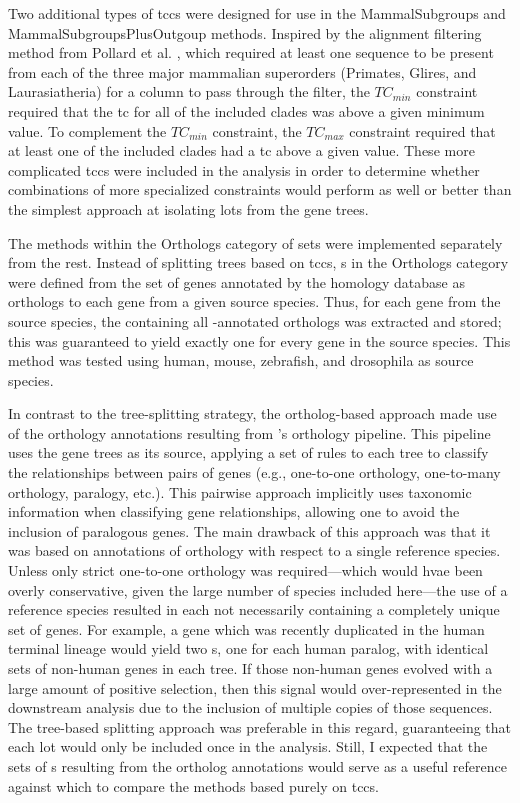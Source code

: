 Two additional types of \acp{tcc} were designed for use in the
MammalSubgroups and MammalSubgroupsPlusOutgoup methods. Inspired by
the alignment filtering method from Pollard et
al. \citeyearpar{Pollard2010}, which required at least one sequence to
be present from each of the three major mammalian superorders
(Primates, Glires, and Laurasiatheria) for a column to pass through
the filter, the $TC_{min}$ constraint required that the \ac{tc} for all
of the included clades was above a given minimum value. To complement
the $TC_{min}$ constraint, the $TC_{max}$ constraint required that at
least one of the included clades had a \ac{tc} above a given
value. These more complicated \acp{tcc} were included in the analysis
in order to determine whether combinations of more specialized
constraints would perform as well or better than the simplest approach
at isolating \acp{lot} from the \cmp gene trees.

The methods within the Orthologs category of \subtr{} sets were
implemented separately from the rest. Instead of splitting \cmp trees
based on \acp{tcc}, \subtr{}s in the Orthologs category were defined
from the set of genes annotated by the \ens homology database as
orthologs to each gene from a given source species. Thus, for each
gene from the source species, the \cmp \subtr containing all
\ens{}-annotated orthologs was extracted and stored; this was
guaranteed to yield exactly one \subtr{} for every gene in the source
species. This method was tested using human, mouse, zebrafish, and
drosophila as source species.

In contrast to the tree-splitting strategy, the ortholog-based
approach made use of the orthology annotations resulting from \ens{}'s
orthology pipeline.  This pipeline uses the \cmp gene trees as its
source, applying a set of rules to each tree to classify the
relationships between pairs of genes (e.g., one-to-one orthology,
one-to-many orthology, paralogy, etc.). This pairwise approach
implicitly uses taxonomic information when classifying gene
relationships, allowing one to avoid the inclusion of paralogous
genes. The main drawback of this approach was that it was based on
annotations of orthology with respect to a single reference
species. Unless only strict one-to-one orthology was required---which
would hvae been overly conservative, given the large number of species
included here---the use of a reference species resulted in each
\subtr{} not necessarily containing a completely unique set of
genes. For example, a gene which was recently duplicated in the human
terminal lineage would yield two \subtr{}s, one for each human
paralog, with identical sets of non-human genes in each tree. If those
non-human genes evolved with a large amount of positive selection,
then this signal would over-represented in the downstream analysis due
to the inclusion of multiple copies of those sequences. The tree-based
\subtr splitting approach was preferable in this regard, guaranteeing
that each \ac{lot} would only be included once in the analysis. Still,
I expected that the sets of \subtr{}s resulting from the \ens ortholog
annotations would serve as a useful reference against which to compare
the methods based purely on \acp{tcc}.

